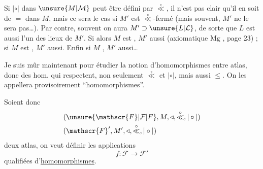 Si $\mathrel{|\circ|}$ dans $\unsure{M|\mathcal{M}}$ peut être défini par $\overset{\circ}{\ll}$, il n'est pas clair qu'il en soit de $=$ dans $M$, mais ce sera le cas si $M'$ est $\overset{\circ}{\ll}$-fermé (mais  souvent, $M'$ ne le sera pas\ldots). Par contre, souvent on aura $M'\supset\unsure{L|\mathcal{L}}$, de sorte que $L$ est aussi l'un des lieux de $M'$. Si alors $M$ est , $M'$ aussi (axiomatique $\mathrm{Mg}$ , page 23) ;  si $M$ est , $M'$ aussi. Enfin si $M$ , $M'$ aussi\ldots


Je suis mûr maintenant pour étudier la notion d'homomorphismes  entre atlas, donc des hom. qui respectent, non seulement $\overset{\circ}{\ll}$ et $\mathrel{|\circ|}$, mais aussi $\leq$. On les appellera provisoirement ``homomorphismes''.


Soient donc
\[
\begin{aligned}
&(\unsure{\mathscr{F}|\mathcal{F}|F},M,\triangleleft,\overset{\circ}{\ll},\mathrel{|\circ|})\\
&(\mathscr{F}',M',\triangleleft,\overset{\circ}{\ll},\mathrel{|\circ|})
\end{aligned}
\]
deux atlas, on veut définir les applications
\[
f:\mathscr{F}\longrightarrow\mathscr{F}'
\]
qualifiées d'\uline{homomorphismes}.
